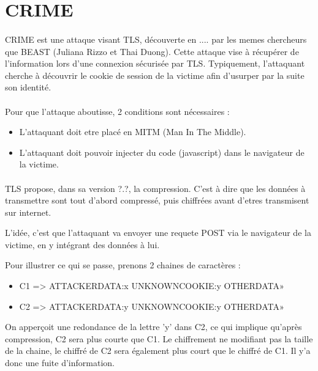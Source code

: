 \section{CRIME}

\paragraph{}
CRIME est une attaque visant TLS, découverte en .... par les memes chercheurs que BEAST (Juliana Rizzo et Thai Duong). Cette attaque vise à récupérer de l'information lors d'une connexion sécurisée par TLS. Typiquement, l'attaquant cherche à découvrir le cookie de session de la victime afin d'usurper par la suite son identité.

\paragraph{}
Pour que l'attaque aboutisse, 2 conditions sont nécessaires :
\begin{itemize}
  \item L'attaquant doit etre placé en MITM (Man In The Middle).
  \item L'attaquant doit pouvoir injecter du code (javascript) dans le navigateur de la victime.
\end{itemize}

\paragraph{}
TLS propose, dans sa version ?.?, la compression. C'est à dire que les données à transmettre sont tout d'abord compressé, puis chiffrées avant d'etres transmisent sur internet.

L'idée, c'est que l'attaquant va envoyer une requete POST via le navigateur de la victime, en y intégrant des données à lui.

Pour illustrer ce qui se passe, prenons 2 chaines de caractères :
\begin{itemize}
\item C1 => ATTACKERDATA:x UNKNOWNCOOKIE:y OTHERDATA»
\item C2 => ATTACKERDATA:y UNKNOWNCOOKIE:y OTHERDATA»
\end{itemize}
On apperçoit une redondance de la lettre 'y' dans C2, ce qui implique qu'après compression, C2 sera plus courte que C1. Le chiffrement ne modifiant pas la taille de la chaine, le chiffré de C2 sera également plus court que le chiffré de C1. Il y'a donc une fuite d'information.

